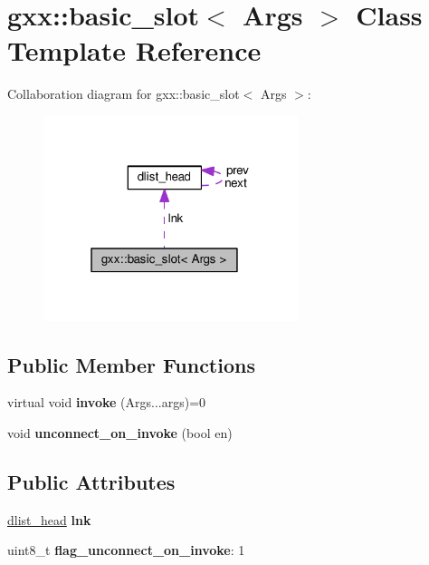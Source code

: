 \hypertarget{classgxx_1_1basic__slot}{}\section{gxx\+:\+:basic\+\_\+slot$<$ Args $>$ Class Template Reference}
\label{classgxx_1_1basic__slot}


Collaboration diagram for gxx\+:\+:basic\+\_\+slot$<$ Args $>$\+:
\nopagebreak
\begin{figure}[H]
\begin{center}
\leavevmode
\includegraphics[width=211pt]{classgxx_1_1basic__slot__coll__graph}
\end{center}
\end{figure}
\subsection*{Public Member Functions}
\begin{DoxyCompactItemize}
\item 
virtual void {\bfseries invoke} (Args...\+args)=0\hypertarget{classgxx_1_1basic__slot_acd9dd2218eceeede793b07f6f5a104a7}{}\label{classgxx_1_1basic__slot_acd9dd2218eceeede793b07f6f5a104a7}

\item 
void {\bfseries unconnect\+\_\+on\+\_\+invoke} (bool en)\hypertarget{classgxx_1_1basic__slot_ae6b3166a79c01e9b818b84e2cd99a823}{}\label{classgxx_1_1basic__slot_ae6b3166a79c01e9b818b84e2cd99a823}

\end{DoxyCompactItemize}
\subsection*{Public Attributes}
\begin{DoxyCompactItemize}
\item 
\hyperlink{structdlist__head}{dlist\+\_\+head} {\bfseries lnk}\hypertarget{classgxx_1_1basic__slot_ac6efa5e7b653f960e7c9a492a819d277}{}\label{classgxx_1_1basic__slot_ac6efa5e7b653f960e7c9a492a819d277}

\item 
uint8\+\_\+t {\bfseries flag\+\_\+unconnect\+\_\+on\+\_\+invoke}\+: 1\hypertarget{classgxx_1_1basic__slot_a535fb110c1ba08716c49a84909008f5e}{}\label{classgxx_1_1basic__slot_a535fb110c1ba08716c49a84909008f5e}

\end{DoxyCompactItemize}

